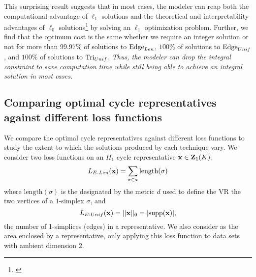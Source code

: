  

This surprising result suggests that in most cases, the modeler can reap both the computational advantage of $\ell_1$ solutions and the theoretical and interpretability advantages of $\ell_0$ solutions\DIFaddbegin \footnote{ \emph{} }  \DIFaddend by solving an $\ell_1$ optimization problem. Further, we find that the optimum cost is the same whether we require an integer solution or not for more than $99.97\%$ of solutions to \pr $\mathrm{Edge}_{Len}$, $100\%$ of solutions to $\mathrm{Edge}_{Unif}$, and $100\%$ of solutions to $\mathrm{Tri}_{Unif}$. \emph{Thus, the modeler can drop the integral constraint to save computation time while still being able to achieve an integral solution in most cases.}  

  


\subsection{Comparing optimal cycle representatives against different loss functions}\label{sec:comparing optimal generators against different loss functions}

We compare the optimal cycle representatives against different loss functions to study the extent to which the solutions produced by each technique vary. We consider two loss functions on an $H_1$ cycle representative $\mathbf{x} \in \mathbf{Z}_1(K)$:
$$L_{E\text{-}Len}(\mathbf{x}) = \sum_{\sigma \in \mathbf{x}} \mathrm{length}(\sigma)$$
where $\mathrm{length}(\sigma)$ is the \DIFdelbegin {}\DIFdelend \DIFaddbegin {}\DIFaddend designated by the metric $d$ used to define the VR \DIFdelbegin {}\DIFdelend \DIFaddbegin {}\DIFaddend the two vertices of a $1$-simplex $\sigma$, and
$$L_{E\text{-}Unif}(\mathbf{x}) = ||\mathbf{x}||_0=|\mathrm{supp}(\mathbf{x})|, $$ 
the number of 1-simplices (edges) in a representative. We also consider \DIFdelbegin {}\DIFdelend \DIFaddbegin {}\DIFaddend as the area enclosed by a representative, \DIFaddbegin {}\DIFaddend only applying this loss function to data sets with ambient dimension $2$. 


